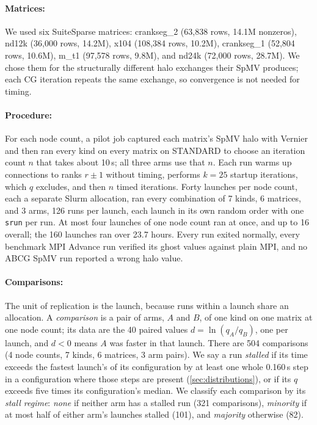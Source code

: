 \documentclass[11pt]{article}
\begin{document}
\paragraph{Matrices:} We used six SuiteSparse matrices: crankseg\_2 (63,838 rows, 14.1M
nonzeros), nd12k (36,000 rows, 14.2M), x104 (108,384 rows, 10.2M), crankseg\_1 (52,804
rows, 10.6M), m\_t1 (97,578 rows, 9.8M), and nd24k (72,000 rows, 28.7M). We chose them
for the structurally different halo exchanges their SpMV produces; each CG iteration
repeats the same exchange, so convergence is not needed for timing.

\paragraph{Procedure:} For each node count, a pilot job captured each matrix's SpMV halo
with Vernier and then ran every kind on every matrix on STANDARD to choose an iteration
count $n$ that takes about 10\,s; all three arms use that $n$. Each run warms up
connections to ranks $r\pm1$ without timing, performs $k=25$ startup iterations, which $q$
excludes, and then $n$ timed iterations. Forty launches per node count, each a separate
Slurm allocation, ran every combination of 7 kinds, 6 matrices, and 3 arms, 126 runs per
launch, each launch in its own random order with one \texttt{srun} per run. At most four
launches of one node count ran at once, and up to 16 overall; the 160 launches ran over
23.7 hours. Every run exited normally, every benchmark MPI Advance run verified its ghost
values against plain MPI, and no ABCG SpMV run reported a wrong halo value.

\paragraph{Comparisons:} The unit of replication is the launch, because runs within a
launch share an allocation. A \emph{comparison} is a pair of arms, $A$ and $B$, of one kind
on one matrix at one node count; its data are the 40 paired values
$d = \ln(q_A/q_B)$, one per launch, and $d<0$ means $A$ was faster in that launch. There are
504 comparisons (4 node counts, 7 kinds, 6 matrices, 3 arm pairs). We say a run
\emph{stalled} if its time exceeds the fastest launch's of its configuration by at least
one whole 0.160\,s step in a configuration where those steps are present
(\cref{sec:distributions}), or if its $q$ exceeds five times its configuration's median.
We classify each comparison by its \emph{stall regime}: \emph{none} if neither arm has a
stalled run (321 comparisons), \emph{minority} if at most half of either arm's launches
stalled (101), and \emph{majority} otherwise (82).
\end{document}
